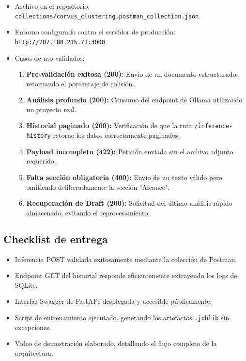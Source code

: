 \begin{itemize}
  \item Archivo en el repositorio: \texttt{collections/corvus\_clustering.postman\_collection.json}.
  \item Entorno configurado contra el servidor de producción: \texttt{http://207.180.215.71:3000}.
  \item Casos de uso validados:
    \begin{enumerate}
      \item \textbf{Pre-validación exitosa (200):} Envío de un documento estructurado, retornando el porcentaje de colisión.
      \item \textbf{Análisis profundo (200):} Consumo del endpoint de Ollama utilizando un proyecto real.
      \item \textbf{Historial paginado (200):} Verificación de que la ruta \texttt{/inference-history} retorne los datos correctamente paginados.
      \item \textbf{Payload incompleto (422):} Petición enviada sin el archivo adjunto requerido.
      \item \textbf{Falta sección obligatoria (400):} Envío de un texto válido pero omitiendo deliberadamente la sección "Alcance".
      \item \textbf{Recuperación de Draft (200):} Solicitud del último análisis rápido almacenado, evitando el reprocesamiento.
    \end{enumerate}
\end{itemize}

\subsection{Checklist de entrega}

\begin{tcolorbox}[checklist,title={Verificación final}]
  \begin{itemize}
    \item[$\square$] Inferencia POST validada exitosamente mediante la colección de Postman.
    \item[$\square$] Endpoint GET del historial responde eficientemente extrayendo los logs de SQLite.
    \item[$\square$] Interfaz Swagger de FastAPI desplegada y accesible públicamente.
    \item[$\square$] Script de entrenamiento ejecutado, generando los artefactos \texttt{.joblib} sin excepciones.
    \item[$\square$] Video de demostración elaborado, detallando el flujo completo de la arquitectura.
  \end{itemize}
\end{tcolorbox}
